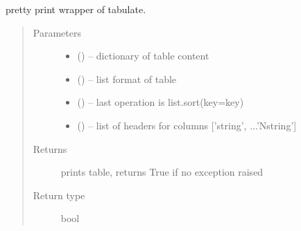 \documentclass[letterpaper,10pt,english]{sphinxmanual}
\begin{document}

\begin{fulllineitems}
\label{\detokenize{rst/utilities:mstack.utilities.print_table}}
pretty print wrapper of tabulate.
\begin{quote}\begin{description}
\item[{Parameters}] \leavevmode\begin{itemize}
\item {} 
 () -- dictionary of table content

\item {} 
 () -- list format of table

\item {} 
 () -- last operation is list.sort(key=key)

\item {} 
 () -- list of headers for columns {[}'string', ...'Nstring'{]}

\end{itemize}

\item[{Returns}] \leavevmode
prints table, returns True if no exception raised

\item[{Return type}] \leavevmode
bool

\end{description}\end{quote}

\end{fulllineitems}

\end{document}
